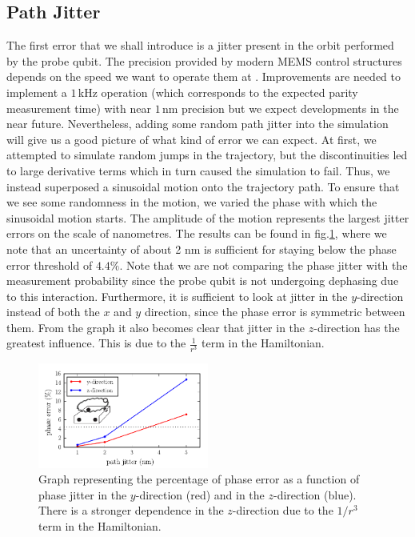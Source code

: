 \subsection{Path Jitter}\label{sec:jitter}
The first error that we shall introduce is a jitter present in the orbit performed by the probe qubit. The precision provided by modern MEMS control structures depends on the speed we want to operate them at \cite{Chu2003,Koo2012}. Improvements are needed to implement a $1\, $kHz operation (which corresponds to the expected parity measurement time) with near $1\, $nm precision but we expect developments in the near future. Nevertheless, adding some random path jitter into the simulation will give us a good picture of what kind of error we can expect. At first, we attempted to simulate random jumps in the trajectory, but the discontinuities led to large derivative terms which in turn caused the simulation to fail. Thus,  we instead superposed a sinusoidal motion onto the trajectory path. To ensure that we see some randomness in the motion, we varied the phase with which the sinusoidal motion starts. The amplitude of the motion represents the largest jitter errors on the scale of nanometres. The results can be found in fig.\@ \ref{fig:pathjitter}, where we note that an uncertainty of about 2 nm is sufficient for staying below the phase error threshold of $4.4 \%$. Note that we are not comparing the phase jitter with the measurement probability since the probe qubit is not undergoing dephasing due to this interaction. Furthermore, it is sufficient to look at jitter in the $y$-direction instead of both the $x$ and $y$ direction, since the phase error is symmetric between them. 
From the graph it also becomes clear that jitter in the $z$-direction has the greatest influence. This is due to the $\frac{1}{r^3}$  term in the Hamiltonian.



\begin{figure}[h]
  \centering
    \includegraphics[width=0.5\textwidth]{../Figures/path_jit.pdf}
      \caption{Graph representing the percentage of phase error as a function of phase jitter in the $y$-direction (red) and in the $z$-direction (blue). There is a stronger dependence in the $z$-direction due to the $1/r^3$ term in the Hamiltonian.}
      \label{fig:pathjitter}
\end{figure}







